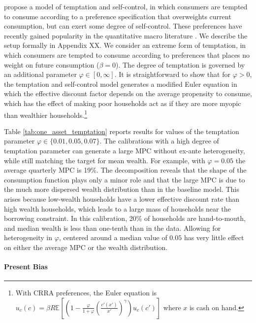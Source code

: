 \citet{gul2001temptation} propose a model of temptation and self-control, in which consumers are tempted to consume according to a preference specification that overweights current consumption, but can exert some degree of self-control. These preferences have recently gained popularity in the quantitative macro literature \citep{krusell2010temptation,krusell2002time,attanasio2020temptation,nakajima2017assessing, pavoni2017optimal}. We describe the setup formally in Appendix XX. We consider an extreme form of temptation, in which  consumers are tempted to consume according to preferences that places no weight on future consumption ($\beta=0$). The degree of temptation is governed by an additional parameter $\varphi \in [0,\infty ]$. It is straightforward to show that for $\varphi>0$, the temptation and self-control model generates a modified Euler equation in which the effective discount factor depends on the average propensity to consume, which has the effect of making poor households act as if they are more myopic than wealthier households.\footnote{With CRRA preferences, the Euler equation is $u_c(c) = \beta R  \mathbb{E} \left[ \left( 1- \frac{\varphi}{1+\varphi} \left(\frac{c'(x')}{x'} \right)^{\gamma}\right)  u_c(c') \right]$ where $x$ is cash on hand.}


Table \ref{tab:one_asset_temptation} reports results for values of the temptation parameter $\varphi \in \{0.01,0.05,0.07\}$. The calibrations with a high degree of temptation parameter can generate a large MPC without ex-ante heterogeneity, while still matching the target for mean wealth. For example, with $\varphi=0.05$ the average quarterly MPC is 19\%. The decomposition reveals that the shape of the consumption function plays only a minor role and that the large MPC is due to the much more dispersed wealth distribution than in the baseline model. This arises because low-wealth households have a lower effective discount rate than high wealth households, which leads to a large mass of households near the borrowing constraint. In this calibration, 20\% of households are hand-to-mouth, and median wealth is less than one-tenth than in the data. Allowing for heterogeneity in $\varphi$, centered around a median value of $0.05$ has very little effect on either the average MPC or the wealth distribution.

\paragraph{Present Bias} \label{sec:one_asset_IG}

